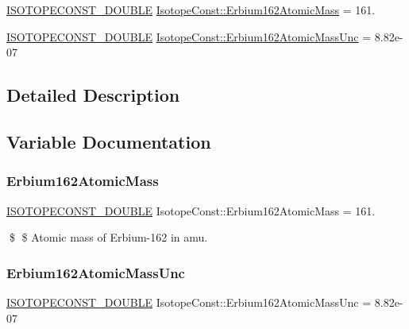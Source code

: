 \begin{DoxyCompactItemize}
\item 
\mbox{\hyperlink{group___isotope_const-_macros_ga8f45a7272ce02c0b4c65c44636ed719a}{I\+S\+O\+T\+O\+P\+E\+C\+O\+N\+S\+T\+\_\+\+D\+O\+U\+B\+LE}} \mbox{\hyperlink{group___isotope_const-_erbium-_er162_gabcbd345dee2cfabb054cb22f9a95ac22}{Isotope\+Const\+::\+Erbium162\+Atomic\+Mass}} = 161.
\item 
\mbox{\hyperlink{group___isotope_const-_macros_ga8f45a7272ce02c0b4c65c44636ed719a}{I\+S\+O\+T\+O\+P\+E\+C\+O\+N\+S\+T\+\_\+\+D\+O\+U\+B\+LE}} \mbox{\hyperlink{group___isotope_const-_erbium-_er162_gaa742858f6dc8904669ddd2668f4512c8}{Isotope\+Const\+::\+Erbium162\+Atomic\+Mass\+Unc}} = 8.\+82e-\/07
\end{DoxyCompactItemize}


\subsection{Detailed Description}


\subsection{Variable Documentation}
\mbox{\label{group___isotope_const-_erbium-_er162_gabcbd345dee2cfabb054cb22f9a95ac22}} 
\subsubsection{\texorpdfstring{Erbium162\+Atomic\+Mass}{Erbium162AtomicMass}}
{\footnotesize\ttfamily \mbox{\hyperlink{group___isotope_const-_macros_ga8f45a7272ce02c0b4c65c44636ed719a}{I\+S\+O\+T\+O\+P\+E\+C\+O\+N\+S\+T\+\_\+\+D\+O\+U\+B\+LE}} Isotope\+Const\+::\+Erbium162\+Atomic\+Mass = 161.}

\$ \$ Atomic mass of Erbium-\/162 in amu. \mbox{\label{group___isotope_const-_erbium-_er162_gaa742858f6dc8904669ddd2668f4512c8}} 
\subsubsection{\texorpdfstring{Erbium162\+Atomic\+Mass\+Unc}{Erbium162AtomicMassUnc}}
{\footnotesize\ttfamily \mbox{\hyperlink{group___isotope_const-_macros_ga8f45a7272ce02c0b4c65c44636ed719a}{I\+S\+O\+T\+O\+P\+E\+C\+O\+N\+S\+T\+\_\+\+D\+O\+U\+B\+LE}} Isotope\+Const\+::\+Erbium162\+Atomic\+Mass\+Unc = 8.\+82e-\/07}

